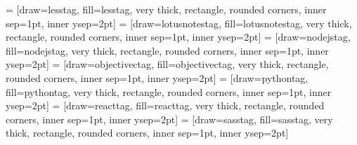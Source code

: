  = [draw=lesstag, fill=lesstag, very thick, rectangle, rounded corners, inner sep=1pt, inner ysep=2pt]
\newcommand{\lesstag}{\begin{tikzpicture}\node [lesstag] (box){{\scriptsize \color{white}{\textbf{\phantom{|}LESS\phantom{|}}}}};\end{tikzpicture}}
 = [draw=lotusnotestag, fill=lotusnotestag, very thick, rectangle, rounded corners, inner sep=1pt, inner ysep=2pt]
\newcommand{\lotusnotestag}{\begin{tikzpicture}\node [lotusnotestag] (box){{\scriptsize \textbf{\phantom{|}Lotus Notes\phantom{|}}}};\end{tikzpicture}}
 = [draw=nodejstag, fill=nodejstag, very thick, rectangle, rounded corners, inner sep=1pt, inner ysep=2pt]
\newcommand{\nodejstag}{\begin{tikzpicture}\node [nodejstag] (box){{\scriptsize \color{white}{\textbf{\phantom{|}Node.js\phantom{|}}}}};\end{tikzpicture}}
 = [draw=objectivectag, fill=objectivectag, very thick, rectangle, rounded corners, inner sep=1pt, inner ysep=2pt]
\newcommand{\objectivectag}{\begin{tikzpicture}\node [objectivectag] (box){{\scriptsize \textbf{\phantom{|}Objective-C\phantom{|}}}};\end{tikzpicture}}
 = [draw=pythontag, fill=pythontag, very thick, rectangle, rounded corners, inner sep=1pt, inner ysep=2pt]
\newcommand{\pythontag}{\begin{tikzpicture}\node [pythontag] (box){{\scriptsize \textbf{\phantom{|}Python\phantom{|}}}};\end{tikzpicture}}
 = [draw=reacttag, fill=reacttag, very thick, rectangle, rounded corners, inner sep=1pt, inner ysep=2pt]
\newcommand{\reacttag}{\begin{tikzpicture}\node [reacttag] (box){{\scriptsize \textbf{\phantom{|}React\phantom{|}}}};\end{tikzpicture}}
 = [draw=sasstag, fill=sasstag, very thick, rectangle, rounded corners, inner sep=1pt, inner ysep=2pt]
\newcommand{\sasstag}{\begin{tikzpicture}\node [sasstag] (box){{\scriptsize \textbf{\phantom{|}SASS\phantom{|}}}};\end{tikzpicture}}
